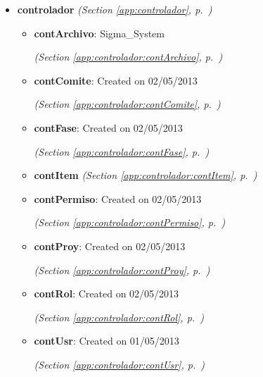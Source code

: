 \begin{itemize}
\setlength{\parskip}{0ex}
\item \textbf{controlador}
  \textit{(Section \ref{app:controlador}, p.~\pageref{app:controlador})}

  \begin{itemize}
\setlength{\parskip}{0ex}
    \item \textbf{contArchivo}: Sigma\_System



  \textit{(Section \ref{app:controlador:contArchivo}, p.~\pageref{app:controlador:contArchivo})}

    \item \textbf{contComite}: Created on 02/05/2013



  \textit{(Section \ref{app:controlador:contComite}, p.~\pageref{app:controlador:contComite})}

    \item \textbf{contFase}: Created on 02/05/2013



  \textit{(Section \ref{app:controlador:contFase}, p.~\pageref{app:controlador:contFase})}

    \item \textbf{contItem}
  \textit{(Section \ref{app:controlador:contItem}, p.~\pageref{app:controlador:contItem})}

    \item \textbf{contPermiso}: Created on 02/05/2013



  \textit{(Section \ref{app:controlador:contPermiso}, p.~\pageref{app:controlador:contPermiso})}

    \item \textbf{contProy}: Created on 02/05/2013



  \textit{(Section \ref{app:controlador:contProy}, p.~\pageref{app:controlador:contProy})}

    \item \textbf{contRol}: Created on 02/05/2013



  \textit{(Section \ref{app:controlador:contRol}, p.~\pageref{app:controlador:contRol})}

    \item \textbf{contUsr}: Created on 01/05/2013



  \textit{(Section \ref{app:controlador:contUsr}, p.~\pageref{app:controlador:contUsr})}


\end{itemize}
\end{itemize}
